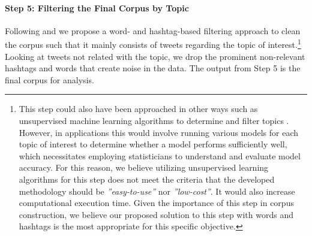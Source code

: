             
            

        
            
            \newline\noindent
            

                
                
        \paragraph{Step 5: Filtering the Final Corpus by Topic} 
        
            \newline\noindent 
            
            Following \cite{conover_predicting_2011} and \cite{small2011hashtag} we propose a word- and hashtag-based filtering approach to clean the corpus such that it mainly consists of tweets regarding the topic of interest.\footnote{This step could also have been approached in other ways such as unsupervised machine learning algorithms to determine and filter topics \citep{hong2010empirical, zhao2011comparing, cataldi2010emerging}. However, in applications this would involve running various models for each topic of interest to determine whether a model performs sufficiently well, which necessitates employing statisticians to understand and evaluate model accuracy. For this reason, we believe utilizing unsupervised learning algorithms for this step does not meet the criteria that the developed methodology should be {\it ''easy-to-use''} nor {\it ''low-cost''}. It would also increase computational execution time. Given the importance of this step in corpus construction, we believe our proposed solution to this step with words and hashtags is the most appropriate for this specific objective.}
            Looking at tweets not related with the topic, we drop the prominent non-relevant hashtags and words that create noise in the data. %
            The output from Step 5 is the final corpus for analysis.
            
